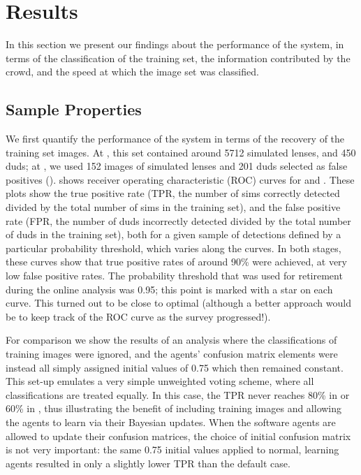 \documentclass[useAMS,usenatbib,a4paper]{mn2e}
\begin{document}

\section{Results}
\label{sec:results}

In this section we present our findings about the performance of the \SW system,
in terms of the classification of the training set, the  information contributed
by the crowd, and the speed at which the image set was classified.


\subsection{Sample Properties}
\label{sec:results:sample}

We first quantify the performance of the \SW system in terms of the recovery of
the training set images. At \StageOne, this set contained around 5712 simulated
lenses, and 450 duds; at \StageTwo, we used 152 images of simulated lenses and
201 duds selected as \StageOne false positives ().
 shows receiver operating characteristic (ROC)
curves for \cfhtls \StageOne and \StageTwo. These plots show the true positive
rate (TPR, the number of sims correctly detected divided by the total number of
sims in the training set), and the false positive rate (FPR, the number of duds
incorrectly detected divided by the total number of duds in the training set), both
for a given sample of detections defined by a particular probability threshold,
which varies along the curves.  In both stages, these curves show that true
positive rates of  around 90\% were achieved, at very low false positive rates.
The probability threshold that was used for retirement during the \StageOne online analysis
was 0.95; this point is marked with a star on each curve.
This turned out to be close to optimal (although a better approach would be to
keep track of the ROC curve as the survey progressed!).

For comparison we show the results of an analysis where the classifications of
training images were ignored, and the agents' confusion matrix elements
were instead all simply assigned initial values of 0.75
which then remained constant. This set-up emulates a
very simple unweighted voting scheme, where all classifications are treated
equally.  In this case, the TPR never reaches 80\% in \StageOne or 60\% in
\StageTwo, thus illustrating the benefit of including training images and
allowing the agents to learn via their Bayesian updates.
When the software agents are allowed to update their confusion matrices, the choice of
initial confusion matrix is not very important: the same 0.75 initial values
applied to normal, learning agents resulted in only a slightly lower TPR than
the default case.
\end{document}
